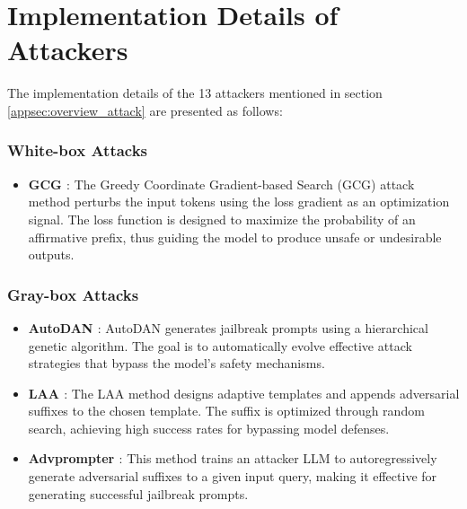 \section{Implementation Details of Attackers}
\label{app:attacker}

The implementation details of the 13 attackers mentioned in section \ref{appsec:overview_attack} are presented as follows:

\subsubsection{White-box Attacks}

\begin{itemize}
    \item \textbf{GCG \cite{DBLP:journals/corr/abs-2307-15043}}: The Greedy Coordinate Gradient-based Search (GCG) attack method perturbs the input tokens using the loss gradient as an optimization signal. The loss function is designed to maximize the probability of an affirmative prefix, thus guiding the model to produce unsafe or undesirable outputs.
\end{itemize}

\subsubsection{Gray-box Attacks}

\begin{itemize}
    \item \textbf{AutoDAN \cite{liu2023autodan}}: AutoDAN generates jailbreak prompts using a hierarchical genetic algorithm. The goal is to automatically evolve effective attack strategies that bypass the model's safety mechanisms.
    \item \textbf{LAA \cite{andriushchenko2024jailbreaking}}: The LAA method designs adaptive templates and appends adversarial suffixes to the chosen template. The suffix is optimized through random search, achieving high success rates for bypassing model defenses.
    \item \textbf{Advprompter \cite{paulus2024advprompter}}: This method trains an attacker LLM to autoregressively generate adversarial suffixes to a given input query, making it effective for generating successful jailbreak prompts.
\end{itemize}

